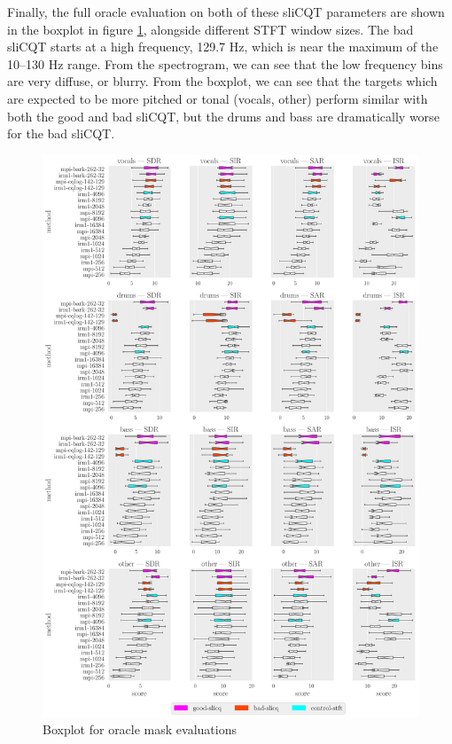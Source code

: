 \documentclass[report.tex]{subfiles}
\begin{document}
Finally, the full oracle evaluation on both of these sliCQT parameters are shown in the boxplot in figure \ref{fig:oraclebssboxplot}, alongside different STFT window sizes. The bad sliCQT starts at a high frequency, 129.7 Hz, which is near the maximum of the 10--130 Hz range. From the spectrogram, we can see that the low frequency bins are very diffuse, or blurry. From the boxplot, we can see that the targets which are expected to be more pitched or tonal (vocals, other) perform similar with both the good and bad sliCQT, but the drums and bass are dramatically worse for the bad sliCQT.

\begin{figure}[ht]
	\centering
	\includegraphics[width=\textwidth]{./images-bss/oracle_boxplot.pdf}
	\caption{Boxplot for oracle mask evaluations}
	\label{fig:oraclebssboxplot}
\end{figure}
\end{document}
